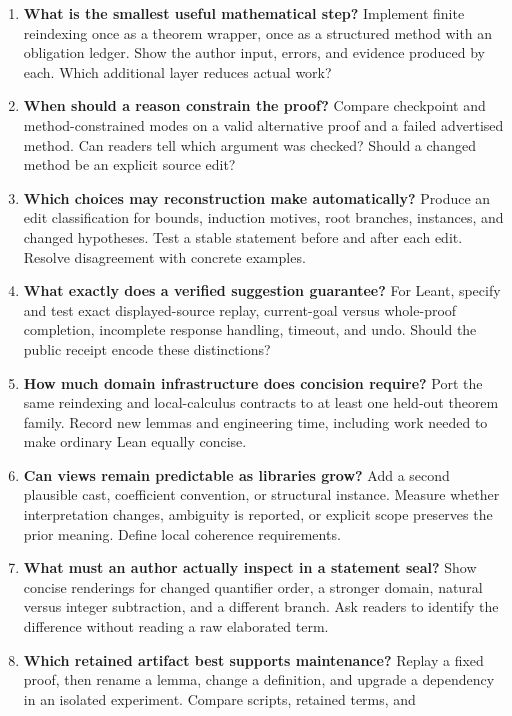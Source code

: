 \documentclass[11pt,letterpaper]{article}
\begin{document}
\begin{enumerate}[label=\textbf{Q\arabic*.},itemsep=.65em]
\item \textbf{What is the smallest useful mathematical step?}
  Implement finite reindexing once as a theorem wrapper, once as a structured
  method with an obligation ledger. Show the author input, errors, and evidence
  produced by each. Which additional layer reduces actual work?
\item \textbf{When should a reason constrain the proof?}
  Compare checkpoint and method-constrained modes on a valid alternative proof
  and a failed advertised method. Can readers tell which argument was checked?
  Should a changed method be an explicit source edit?
\item \textbf{Which choices may reconstruction make automatically?}
  Produce an edit classification for bounds, induction motives, root branches,
  instances, and changed hypotheses. Test a stable statement before and after
  each edit. Resolve disagreement with concrete examples.
\item \textbf{What exactly does a verified suggestion guarantee?}
  For Leant, specify and test exact displayed-source replay, current-goal versus
  whole-proof completion, incomplete response handling, timeout, and undo.
  Should the public receipt encode these distinctions?
\item \textbf{How much domain infrastructure does concision require?}
  Port the same reindexing and local-calculus contracts to at least one held-out
  theorem family. Record new lemmas and engineering time, including work needed
  to make ordinary Lean equally concise.
\item \textbf{Can views remain predictable as libraries grow?}
  Add a second plausible cast, coefficient convention, or structural instance.
  Measure whether interpretation changes, ambiguity is reported, or explicit
  scope preserves the prior meaning. Define local coherence requirements.
\item \textbf{What must an author actually inspect in a statement seal?}
  Show concise renderings for changed quantifier order, a stronger domain,
  natural versus integer subtraction, and a different branch. Ask readers to
  identify the difference without reading a raw elaborated term.
\item \textbf{Which retained artifact best supports maintenance?}
  Replay a fixed proof, then rename a lemma, change a definition, and upgrade a
  dependency in an isolated experiment. Compare scripts, retained terms, and

\end{enumerate}
\end{document}
